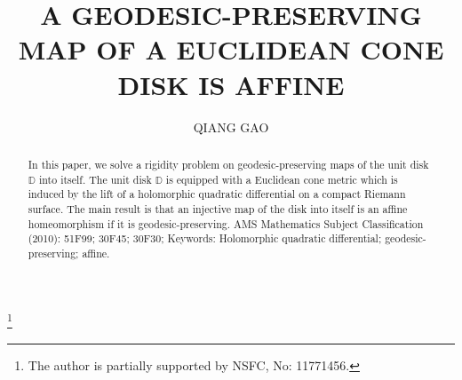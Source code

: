 \documentclass{amsart}
\theoremstyle{plain}
\theoremstyle{definition}
\theoremstyle{remark}
\begin{document}
% 
\title{A GEODESIC-PRESERVING MAP OF A EUCLIDEAN CONE DISK IS AFFINE}
\author{QIANG GAO}
% 
\address{Department of Mathematics, Sun Yat-Sen University, 510275, Guangzhou, P. R. China}
\thanks{The author is partially supported by NSFC, No: 11771456.  }
% 
% 
\begin{abstract}
    In this paper, we solve a rigidity problem on geodesic-preserving maps of the unit disk $\mathbb{D}$ into itself.  The unit disk $\mathbb{D}$ is equipped with a Euclidean cone metric which is induced by the lift of a holomorphic quadratic differential on a compact Riemann surface.  The main result is that an injective map of the disk into itself is an affine homeomorphism if it is geodesic-preserving.  
% 
\bigskip
% 
% 
\noindent AMS Mathematics Subject Classification (2010): 51F99; 30F45; 30F30; 
% 
\medskip
% 
\noindent Keywords: Holomorphic quadratic differential; geodesic-preserving; affine.  
\end{abstract}
% 
% 
\maketitle
% 
\end{document}
